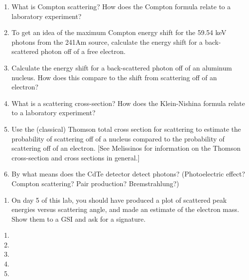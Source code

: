 \documentclass{../signatures}
\begin{document}
\maketitle

\names

\prelab

\begin{enumerate}

    \item What is Compton scattering? How does the Compton formula relate to a laboratory experiment?
    
    \item To get an idea of the maximum Compton energy shift for the 59.54 keV photons from the 241Am source, calculate the energy shift for a back-scattered photon off of a free electron.

    \item Calculate the energy shift for a back-scattered photon off of an aluminum nucleus. How does this compare to the shift from scattering off of an electron?

    \item What is a scattering cross-section? How does the Klein-Nishina formula relate to a laboratory experiment?

    \item Use the (classical) Thomson total cross section for scattering to estimate the probability of scattering off of a nucleus compared to the probability of scattering off of an electron. [See Melissinos for information on the Thomson cross-section and cross sections in general.]

    \item By what means does the CdTe detector detect photons? (Photoelectric effect? Compton scattering? Pair production? Bremstrahlung?)
       \\[36pt]
\end{enumerate}

\prelabsignatures

\midlab

\begin{enumerate}

    \item On day 5 of this lab, you should have produced a plot of scattered peak energies versus scattering angle, and made an estimate of the electron mass. Show them to a GSI and ask for a signature.
\\[36pt]
\end{enumerate}


\checkpointsection 

\begin{enumerate}

\item {}

\item {}

\item {}

\item {}

\item {}

\end{enumerate}
\end{document}
